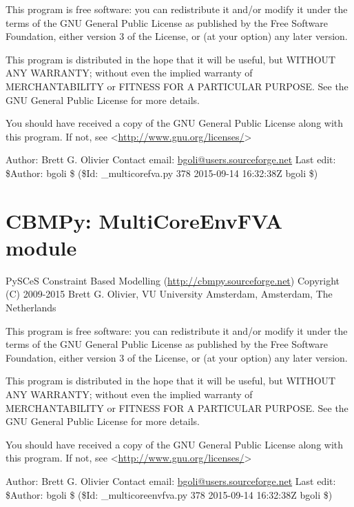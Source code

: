 \documentclass[a4paper,11pt,english]{sphinxmanual}
\begin{document}
This program is free software: you can redistribute it and/or modify
it under the terms of the GNU General Public License as published by
the Free Software Foundation, either version 3 of the License, or
(at your option) any later version.

This program is distributed in the hope that it will be useful,
but WITHOUT ANY WARRANTY; without even the implied warranty of
MERCHANTABILITY or FITNESS FOR A PARTICULAR PURPOSE.  See the
GNU General Public License for more details.

You should have received a copy of the GNU General Public License
along with this program.  If not, see \textless{}\href{http://www.gnu.org/licenses/}{http://www.gnu.org/licenses/}\textgreater{}

Author: Brett G. Olivier
Contact email: \href{mailto:bgoli@users.sourceforge.net}{bgoli@users.sourceforge.net}
Last edit: \$Author: bgoli \$ (\$Id: \_multicorefva.py 378 2015-09-14 16:32:38Z bgoli \$)
\label{modules_doc:module-cbmpy._multicoreenvfva}

\section{CBMPy: MultiCoreEnvFVA module}
\label{modules_doc:cbmpy-multicoreenvfva-module}
PySCeS Constraint Based Modelling (\href{http://cbmpy.sourceforge.net}{http://cbmpy.sourceforge.net})
Copyright (C) 2009-2015 Brett G. Olivier, VU University Amsterdam, Amsterdam, The Netherlands

This program is free software: you can redistribute it and/or modify
it under the terms of the GNU General Public License as published by
the Free Software Foundation, either version 3 of the License, or
(at your option) any later version.

This program is distributed in the hope that it will be useful,
but WITHOUT ANY WARRANTY; without even the implied warranty of
MERCHANTABILITY or FITNESS FOR A PARTICULAR PURPOSE.  See the
GNU General Public License for more details.

You should have received a copy of the GNU General Public License
along with this program.  If not, see \textless{}\href{http://www.gnu.org/licenses/}{http://www.gnu.org/licenses/}\textgreater{}

Author: Brett G. Olivier
Contact email: \href{mailto:bgoli@users.sourceforge.net}{bgoli@users.sourceforge.net}
Last edit: \$Author: bgoli \$ (\$Id: \_multicoreenvfva.py 378 2015-09-14 16:32:38Z bgoli \$)
\label{modules_doc:module-cbmpy.miriamids}
\end{document}
